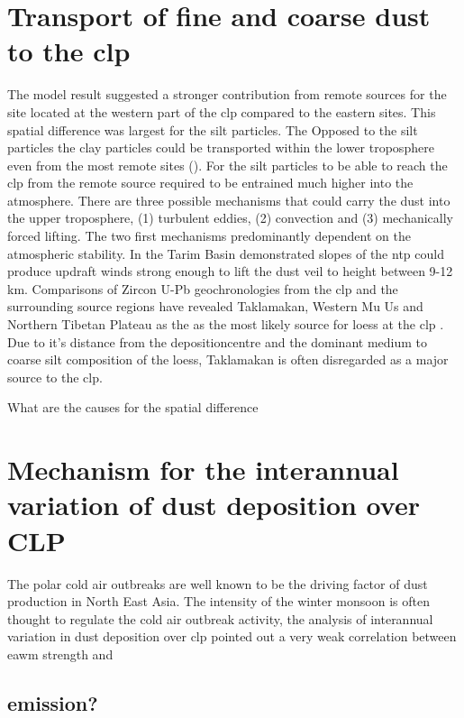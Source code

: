 \section{Transport of fine and coarse dust to the \acrshort{clp}}
The model result suggested a stronger contribution from remote sources for the site located at the western part of the \acrshort{clp} compared to the eastern sites. This spatial difference was largest for the silt particles. The   
Opposed to the silt particles the clay particles could be transported within the lower troposphere even from the most remote sites ().  For the silt particles to be able to reach the \acrshort{clp} from the remote source required to be entrained much higher into the atmosphere. There are three possible mechanisms that could carry the dust into the upper troposphere, (1) turbulent eddies, (2) convection and (3) mechanically forced lifting. The two first mechanisms predominantly dependent on the atmospheric stability. In the Tarim Basin \textcite{yumimoto_elevated_2009} demonstrated slopes of the \acrfull{ntp} could produce updraft winds strong enough to lift the dust veil to height between 9-12 km. Comparisons of Zircon U-Pb geochronologies from the \acrshort{clp} and the surrounding source regions have revealed Taklamakan, Western Mu Us and Northern Tibetan Plateau as the as the most likely source for loess at the \acrshort{clp} \parencite{bird2015quaternary}. Due to it's distance from the depositioncentre and the dominant medium to coarse silt composition of the loess, Taklamakan is often disregarded as a major source to the \acrshort{clp}.                 





What are the causes for the spatial difference


\section{Mechanism for the interannual variation of dust deposition over CLP }
The polar cold air outbreaks are well known to be the driving factor of dust production in North East Asia. The intensity of the winter monsoon is often thought to regulate the cold air outbreak activity, the analysis of interannual variation in dust deposition over \acrshort{clp} pointed out a very weak correlation between \acrshort{eawm} strength and  


\subsection{emission?}



